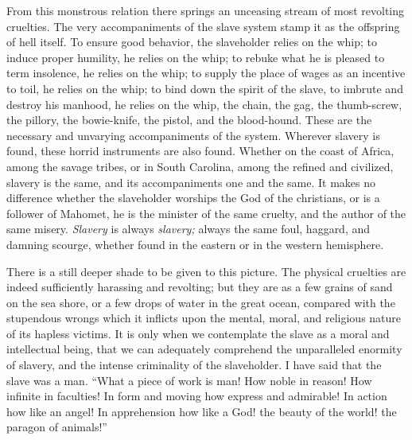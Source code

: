 From this monstrous relation there springs an unceasing stream of most
revolting cruelties. The very accompaniments of the slave system stamp
it as the offspring of hell itself. To ensure good behavior, the
slaveholder relies on the whip; to induce proper humility, he relies on
the whip; to rebuke what he is pleased to term insolence, he relies on
the whip; to supply the place of wages as an incentive to toil, he
relies on the whip; to bind down the spirit of the slave, to imbrute and
destroy his manhood, he relies on the whip, the chain, the gag, the
thumb-screw, the pillory, the bowie-knife, the pistol, and the
blood-hound. These are the necessary and unvarying accompaniments of the
system. Wherever slavery is found, these horrid instruments are also
found. Whether on the coast of Africa, among the savage tribes, or in
South Carolina, among the refined and civilized, slavery is the same,
and its accompaniments one and the same. It makes no difference whether
the slaveholder worships the God of the christians, or is a follower of
Mahomet, he is the minister of the same cruelty, and the author of the
same misery. \emph{Slavery} is always \emph{slavery;} always the same
foul, haggard, and damning scourge, whether found in the eastern or in
the western hemisphere.

There is a still deeper shade to be given to this picture. The physical
cruelties are indeed sufficiently harassing and revolting; but they are
as a few grains of sand on the sea shore, or a few drops of water in the
great ocean, compared with the stupendous wrongs which it inflicts upon
the mental, moral, and religious {}nature of its hapless victims. It is
only when we contemplate the slave as a moral and intellectual being,
that we can adequately comprehend the unparalleled enormity of slavery,
and the intense criminality of the slaveholder. I have said that the
slave was a man. ``What a piece of work is man! How noble in reason! How
infinite in faculties! In form and moving how express and admirable! In
action how like an angel! In apprehension how like a God! the beauty of
the world! the paragon of animals!''

